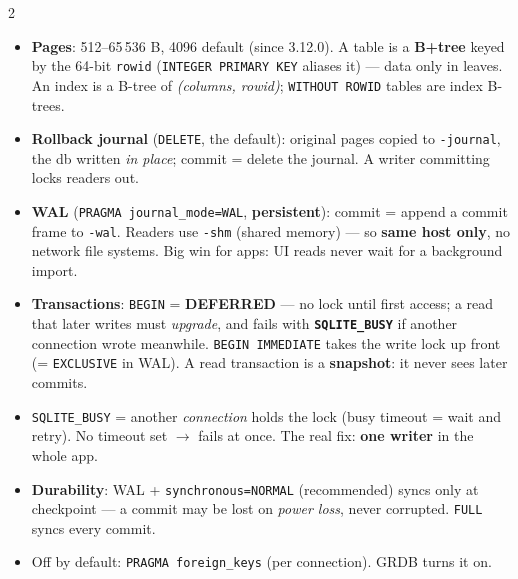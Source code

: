 \documentclass[8pt]{extarticle}
\newcommand\ct[1]{\texttt{#1}}
\newcommand\hd[1]{\par\vspace{3pt}\noindent{\bfseries\color{sheetBlue}#1}\par\vspace{1pt}}
\begin{document}
\begin{multicols}{2}
\raggedright\small{}

\hd{How it works}
\begin{itemize}
  \item \textbf{Pages}: 512–65\,536 B, 4096 default (since 3.12.0). A table is a \textbf{B+tree} keyed by
        the 64-bit \ct{rowid} (\ct{INTEGER PRIMARY KEY} aliases it) — data only in leaves. An
        index is a B-tree of \emph{(columns, rowid)}; \ct{WITHOUT ROWID} tables are index B-trees.
  \item \textbf{Rollback journal} (\ct{DELETE}, the default): original pages copied to \ct{-journal},
        the db written \emph{in place}; commit = delete the journal. A writer committing locks readers out.
  \item \textbf{WAL} (\ct{PRAGMA journal\_mode=WAL}, \textbf{persistent}): commit = append a commit
        frame to \ct{-wal}. Readers use \ct{-shm} (shared memory) — so \textbf{same host only}, no network
        file systems. Big win for apps: UI reads never wait for a background import.
  \item \textbf{Transactions}: \ct{BEGIN} = \textbf{DEFERRED} — no lock until first access; a read that
        later writes must \emph{upgrade}, and fails with \textbf{\ct{SQLITE\_BUSY}} if another connection
        wrote meanwhile. \ct{BEGIN IMMEDIATE} takes the write lock up front (= \ct{EXCLUSIVE} in WAL).
        A read transaction is a \textbf{snapshot}: it never sees later commits.
  \item \ct{SQLITE\_BUSY} = another \emph{connection} holds the lock (busy timeout = wait and retry).
        No timeout set $\to$ fails at once. The real fix: \textbf{one writer} in the whole app.
  \item \textbf{Durability}: WAL + \ct{synchronous=NORMAL} (recommended) syncs only at checkpoint — a
        commit may be lost on \emph{power loss}, never corrupted. \ct{FULL} syncs every commit.
  \item Off by default: \ct{PRAGMA foreign\_keys} (per connection). GRDB turns it on.
\end{itemize}


\end{multicols}
\end{document}
